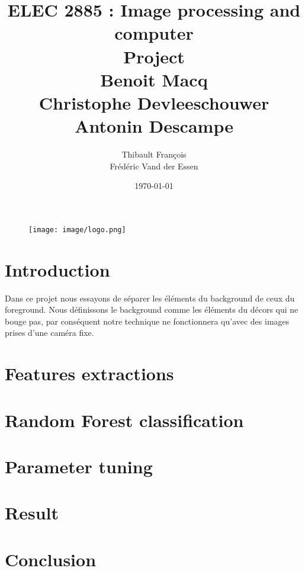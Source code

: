 \documentclass[11pt,a4paper]{report}
\title{ELEC 2885 : Image processing and computer  \\ Project \\
Benoit Macq \\ Christophe Devleeschouwer \\ Antonin Descampe}
\author{Thibault François \\ Frédéric Vand der Essen}
\date{\today}
\begin{document}
	\begin{titlepage}		
		\begin{figure}[tbp]
			\begin{center}
				\texttt{[image: image/logo.png]}
			\end{center}
		\end{figure}
		\maketitle
	\end{titlepage}

\section{Introduction}
Dans ce projet nous essayons de séparer les éléments du background de ceux du foreground. Nous définissons le background comme les éléments du décors
qui ne bouge pas, par conséquent notre technique ne fonctionnera qu'avec des images prises d'une caméra fixe. 

\section{Features extractions}


\section{Random Forest classification}

\section{Parameter tuning}


\section{Result}

\section{Conclusion}
	
	
	
\end{document}
